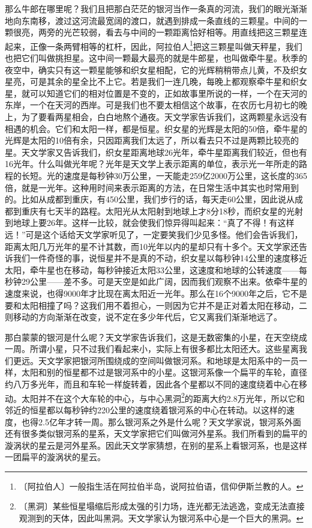 \documentclass[12pt,UTF-8,openany]{ctexbook}
\begin{document}
\begin{normalsize}
    那么牛郎在哪里呢？我们且把那白茫茫的银河当作一条真的河流，我们的眼光渐渐地向东南移，渡过这河流最宽阔的渡口，就遇到排成一条直线的三颗星。中间的一颗很亮，两旁的光芒较弱，看去与中间的一颗距离恰好相等。用直线把这三颗星连起来，正像一条两臂相等的杠杆，因此，阿拉伯人\footnote{〔阿拉伯人〕一般指生活在阿拉伯半岛，说阿拉伯语，信仰伊斯兰教的人。}把这三颗星叫做天秤星，我们也把它们叫做挑担星。这中间一颗最大最亮的就是牛郎星，也叫做牵牛星。秋季的夜空中，确实只有这一颗星能够和织女星相配，它的光辉稍稍带点儿黄，不及织女星亮，可是其余的星全比不上它。若是我们一连几晚，每晚上都观察牵牛星和织女星，就可以知道它们的相对位置是不变的，正如故事里所说的一样，一个在天河的东岸，一个在天河的西岸。可是我们也不要太相信这个故事，在农历七月初七的晚上，为了要看两星相会，白白地熬个通夜。天文学家告诉我们，这两颗星永远没有相遇的机会。它们和太阳一样，都是恒星。织女星的光辉是太阳的50倍，牵牛星的光辉是太阳的10倍有余，只因距离我们太远了，所以看去只不过是两颗比较亮的星。天文学家又告诉我们，织女星距离地球26光年，牵牛星距离我们较近，但也有16光年。什么叫做光年呢？光年是天文学上表示距离的单位，表示光一年所走的路程的长短。光的速度是每秒钟30万公里，一天能走259亿2000万公里，这长度的365倍，就是一光年。这种用时间来表示距离的方法，在日常生活中其实也时常用到的。比如从成都到重庆，有450公里，我们步行的话，每天走60公里，因此说从成都到重庆有七天半的路程。太阳光从太阳射到地球上才8分18秒，而织女星的光射到地球上要26年。这样一比较，就会使我们惊异得叫起来：“真了不得！有这样远！”可是这个话给天文学家听见了，一定要笑我们少见多怪。他们会告诉我们，距离太阳几万光年的星不计其数，而10光年以内的星却只有十多个。天文学家还告诉我们一件奇怪的事，说恒星并不是真的不动，织女星以每秒钟14公里的速度移近太阳，牵牛星也在移动，每秒钟接近太阳33公里，这速度和地球的公转速度——每秒钟29公里——差不多。可是天空是如此广阔，因而我们观察不出来。依牵牛星的速度来说，也得9000年才比现在离太阳近一光年。那么在16个9000年之后，它不是要和太阳相撞了吗？这我们用不着担心，一则因为它并不是正对着太阳在移动，二则移动的方向渐渐在改变，说不定在多少年代后，它又离我们渐渐地远了。
    
    那白蒙蒙的银河是什么呢？天文学家告诉我们，这是无数密集的小星，在天空绕成一周。所谓小星，只不过我们看起来小，实际上有很多都比太阳还大。这些星离我们更远。天文学家把银河所围绕成的空间叫做银河系。和地球是太阳系中的一员一样，太阳和别的恒星都不过是银河系中的小星。这银河系像一个扁平的车轮，直径约八万多光年，而且和车轮一样旋转着，因此各个星都以不同的速度绕着中心在移动。太阳并不在这个大车轮的中心，与中心黑洞\footnote{〔黑洞〕某些恒星塌缩后形成太强的引力场，连光都无法逃逸，变成无法直接观测到的天体，因此叫黑洞。天文学家认为银河系中心是一个巨大的黑洞。}的距离大约2.8万光年，所以它和邻近的恒星都以每秒钟约220公里的速度绕着银河系的中心在转动。以这样的速度，也得2.5亿年才转一周。那么银河系之外是什么呢？天文学家说，银河系外面还有很多类似银河系的星系，天文学家把它们叫做河外星系。我们所看到的扁平的漩涡状的星云是河外星系。因此天文学家猜想，在别的星系上看银河系，也是这样一团扁平的漩涡状的星云。
    

\end{normalsize}
\end{document}
